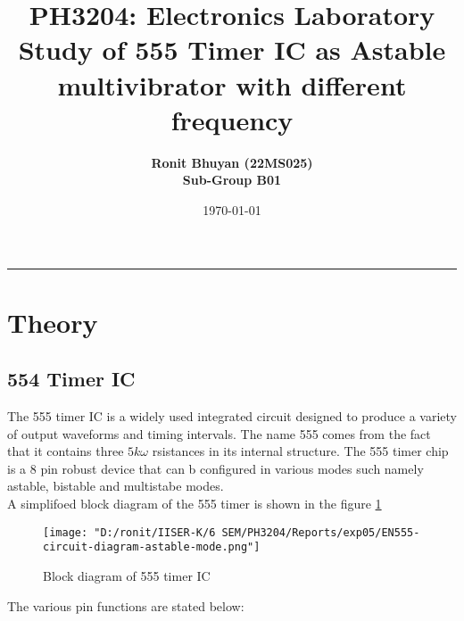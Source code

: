 \documentclass[12pt]{article}
\title{
  \vspace{-2cm}
  \Huge \textbf{PH3204: Electronics Laboratory} \\[0.4cm]
  \Large \textbf{ Study of 555 Timer IC as Astable multivibrator with different frequency}
}
\author{
  \textbf{Ronit Bhuyan (22MS025)} \\[0.2cm]
  \textbf{Sub-Group B01}
}
\date{\today}
\begin{document}
\maketitle

\tableofcontents
\noindent\rule{\textwidth}{0.4pt}
\newpage

\section{Theory}
\subsection{554 Timer IC}
The 555 timer IC is a widely used integrated circuit designed to produce a variety of output waveforms and timing intervals. The name 555 comes from the fact that it contains three $5 k\omega$ rsistances in its internal structure. The 555 timer chip is a 8 pin robust device that can b configured in various modes such namely astable, bistable and multistabe modes. \\
A simplifoed block diagram of the 555 timer is shown in the figure \ref{fig:555_timer}
\begin{figure}[H]
   \centering
    \texttt{[image: "D:/ronit/IISER-K/6 SEM/PH3204/Reports/exp05/EN555-circuit-diagram-astable-mode.png"]}
    \caption{Block diagram of 555 timer IC}
    \label{fig:555_timer}
\end{figure}
\noindent
The various pin functions are stated below:
\end{document}
